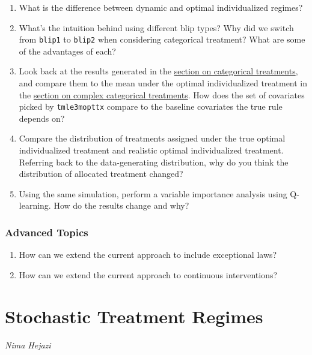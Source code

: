 \documentclass[
  12pt, krantz2,
]{krantz}
\newcommand{\passthrough}[1]{#1}
\theoremstyle{definition}
\theoremstyle{definition}
\theoremstyle{definition}
\newcommand{\1}{\mathbbm{1}}
\begin{document}
\begin{enumerate}
\def\labelenumi{\arabic{enumi}.}
\item
  What is the difference between dynamic and optimal individualized regimes?
\item
  What's the intuition behind using different blip types? Why did we switch
  from \passthrough{\lstinline!blip1!} to \passthrough{\lstinline!blip2!} when considering categorical treatment? What are some
  of the advantages of each?
\item
  Look back at the results generated in the \protect\hyperlink{oit-eval-cat-v1}{section on categorical
  treatments}, and compare them to the mean under the optimal
  individualized treatment in the \protect\hyperlink{oit-eval-bin-v2}{section on complex categorical
  treatments}. How does the set of covariates picked by \passthrough{\lstinline!tmle3mopttx!}
  compare to the baseline covariates the true rule depends on?
\item
  Compare the distribution of treatments assigned under the true optimal
  individualized treatment and realistic optimal individualized treatment.
  Referring back to the data-generating distribution, why do you think the
  distribution of allocated treatment changed?
\item
  Using the same simulation, perform a variable importance analysis using
  Q-learning. How do the results change and why?
\end{enumerate}

\hypertarget{advanced-topics-1}{%
\subsection{Advanced Topics}\label{advanced-topics-1}}

\begin{enumerate}
\def\labelenumi{\arabic{enumi}.}
\item
  How can we extend the current approach to include exceptional laws?
\item
  How can we extend the current approach to continuous interventions?
\end{enumerate}

\hypertarget{stochastic-treatment-regimes}{%
\chapter{Stochastic Treatment Regimes}\label{stochastic-treatment-regimes}}

\emph{Nima Hejazi}
\end{document}
